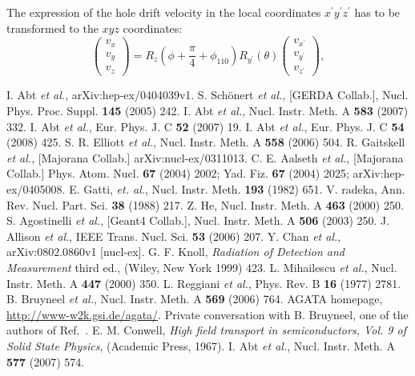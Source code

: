 \documentclass[epj]{svjour}
\begin{document}
The expression of the hole drift velocity in the local coordinates
$x^{\prime} y^{\prime} z^{\prime}$ has to be transformed to the $xyz$
coordinates:
\begin{equation} 
\label{e:v2v}   
\left( 
\begin{array}{c} 
v_{x} \\ v_{y} \\ v_{z} 
\end{array} 
\right) = R_{z}(\phi + \frac{\pi}{4} + \phi_{110}) R_{y^{\prime}}(\theta) \left(  
\begin{array}{c} 
v_{x^{\prime}} \\ v_{y^{\prime}} \\ v_{z^{\prime}} 
\end{array} \right), 
\end{equation}

\begin{thebibliography}{}
I. Abt \textit{et al.}, arXiv:hep-ex/0404039v1.
S. Sch\"onert \textit{et al.}, [GERDA Collab.],
Nucl. Phys. Proc. Suppl. \textbf{145} (2005) 242.
I. Abt \textit{et al.}, Nucl. Instr. Meth. A
\textbf{583} (2007) 332.
I. Abt \textit{et al.}, Eur. Phys. J. C \textbf{52}
(2007) 19.
I. Abt \textit{et al.}, Eur. Phys. J. C \textbf{54}
(2008) 425.
S. R. Elliott \textit{et al.}, Nucl. Instr. Meth. A
\textbf{558} (2006) 504.
R. Gaitskell \textit{et al.}, [Majorana Collab.]
arXiv:nucl-ex/0311013.
C. E. Aalseth \textit{et al.}, [Majorana Collab.]
Phys. Atom. Nucl. \textbf{67} (2004) 2002; Yad. Fiz. \textbf{67}
(2004) 2025; arXiv:hep-ex/0405008.
E. Gatti, \textit{et. al.},
Nucl. Instr. Meth. \textbf{193} (1982) 651.
V. radeka, Ann. Rev. Nucl. Part. Sci. \textbf{38}
(1988) 217.
Z. He, Nucl. Instr. Meth. A \textbf{463} (2000) 250.
S. Agostinelli \textit{et al.}, [Geant4 Collab.],
Nucl. Instr. Meth. A \textbf{506} (2003) 250.
J. Allison \textit{et al.}, IEEE
Trans. Nucl. Sci. \textbf{53} (2006) 207.
Y. Chan \textit{et al.}, arXiv:0802.0860v1 [nucl-ex].
G. F. Knoll, \textit{Radiation of Detection and
Measurement} third ed., (Wiley, New York 1999) 423.
L. Mihailescu \textit{et al.}, Nucl. Instr. Meth. A
\textbf{447} (2000) 350.
L. Reggiani \textit{et al.}, Phys. Rev. B \textbf{16}
(1977) 2781.
B. Bruyneel \textit{et al.}, Nucl. Instr. Meth. A
\textbf{569} (2006) 764.
AGATA homepage, \url{http://www-w2k.gsi.de/agata/}.
Private conversation with B. Bruyneel, one of the
authors of Ref.~\cite{bart}.
E. M. Conwell, \textit{High field transport in
semiconductors, Vol. 9 of Solid State Physics}, (Academic Press,
1967).
I. Abt \textit{et al.}, Nucl. Instr. Meth. A \textbf{577}
(2007) 574.

\end{thebibliography}
%
\end{document}
